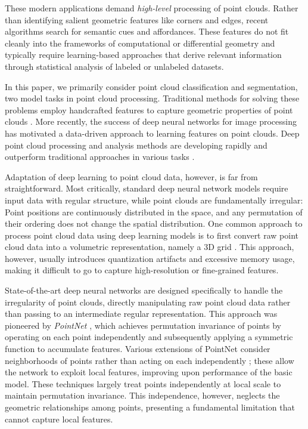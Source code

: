 \documentclass[acmtog]{acmart}
\begin{document}
These modern applications demand \emph{high-level} processing of point clouds.  Rather than identifying salient geometric features like corners and edges, recent algorithms search for semantic cues and affordances.  These features do not fit cleanly into the frameworks of computational or differential geometry and typically require learning-based approaches that derive relevant information through statistical analysis of labeled or unlabeled datasets.  

In this paper, we primarily consider point cloud classification and segmentation, two model tasks in point cloud processing.  Traditional methods for solving these problems employ handcrafted features to capture geometric properties of point clouds \cite{lu2014recognizing, rusu2009fast, rusu2008aligning}. More recently, the success of deep neural networks for image processing has motivated a data-driven approach to learning features on point clouds.  Deep point cloud processing and analysis methods are developing rapidly and outperform traditional approaches in various tasks \cite{chang2015shapenet}.

Adaptation of deep learning to point cloud data, however, is far from straightforward.  Most critically, standard deep neural network models require input data with regular structure, while point clouds are fundamentally irregular: Point positions are continuously distributed in the space, and any permutation of their ordering does not change the spatial distribution. One common approach to process point cloud data using deep learning models is to first convert raw point cloud data into a volumetric representation, namely a 3D grid \cite{maturana2015voxnet, wu20153d}. This approach, however, usually introduces quantization artifacts and excessive memory usage, making it difficult to go to capture high-resolution or fine-grained features.

State-of-the-art deep neural networks are designed specifically to handle the irregularity of point clouds, directly manipulating raw point cloud data rather than passing to an intermediate regular representation.  This approach was pioneered by \textit{PointNet} \cite{DBLP:journals/corr/QiSMG16}, which achieves permutation invariance of points by operating on each point independently and subsequently applying a symmetric function to accumulate features. Various extensions of PointNet consider neighborhoods of points rather than acting on each independently \cite{DBLP:journals/corr/QiYSG17, shen2017neighbors}; these allow the network to exploit local features, improving upon performance of the basic model. These techniques largely treat points independently at local scale to maintain permutation invariance. This independence, however, neglects the geometric relationships among points, presenting a fundamental limitation that cannot capture local features. 
\end{document}
